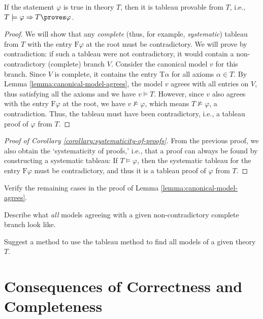 \begin{theorem}[Completeness]
    If the statement $\varphi$ is true in theory $T$, then it is tableau provable from $T$, i.e., $T \models \varphi \Rightarrow T \proves \varphi$.    
\end{theorem}

\begin{proof}
We will show that any \emph{complete} (thus, for example, \emph{systematic}) tableau from $T$ with the entry $\mathrm{F}\varphi$ at the root must be contradictory. We will prove by contradiction: if such a tableau were not contradictory, it would contain a non-contradictory (complete) branch $V$. Consider the canonical model $v$ for this branch. Since $V$ is complete, it contains the entry $\mathrm{T}\alpha$ for all axioms $\alpha \in T$. By Lemma \ref{lemma:canonical-model-agrees}, the model $v$ agrees with all entries on $V$, thus satisfying all the axioms and we have $v \models T$. However, since $v$ also agrees with the entry $\mathrm{F}\varphi$ at the root, we have $v \not\models \varphi$, which means $T \not\models \varphi$, a contradiction. Thus, the tableau must have been contradictory, i.e., a tableau proof of $\varphi$ from $T$.
\end{proof}

\begin{proof}[Proof of Corollary \ref{corollary:systematicity-of-proofs}]
From the previous proof, we also obtain the `systematicity of proofs,' i.e., that a proof can always be found by constructing a systematic tableau: If $T \models \varphi$, then the systematic tableau for the entry $\mathrm{F}\varphi$ must be contradictory, and thus it is a tableau proof of $\varphi$ from $T$.
\end{proof}

\begin{exercise}
    Verify the remaining cases in the proof of Lemma \ref{lemma:canonical-model-agrees}.
\end{exercise}

\begin{exercise}
    Describe what \emph{all} models agreeing with a given non-contradictory complete branch look like.
\end{exercise}

\begin{exercise}
    Suggest a method to use the tableau method to find all models of a given theory $T$.
\end{exercise}

\section{Consequences of Correctness and Completeness}

